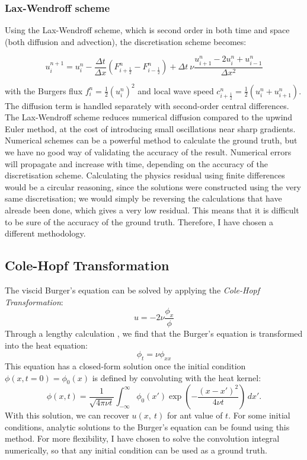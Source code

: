 \documentclass[we,twoside,openright,a4paper,11pt]{uantwerpenbamathesis}
\begin{document}
\subsubsection{Lax-Wendroff scheme}
Using the Lax-Wendroff scheme, which is second order in both time and space (both diffusion and advection), the discretisation scheme becomes:

\begin{equation}
    u_i^{n+1} = u_i^n - \frac{\Delta t}{\Delta x}\left(F_{i+\frac{1}{2}}^n - F_{i-\frac{1}{2}}^n\right) + \Delta t \ \nu \frac{u_{i+1}^n - 2u_i^n + u_{i-1}^n}{\Delta x^2}
\end{equation}

with the Burgers flux $f_i^n = \tfrac{1}{2}(u_i^n)^2$ and local wave speed $c_{i+\frac{1}{2}}^n = \tfrac{1}{2}(u_i^n + u_{i+1}^n)$. The diffusion term is handled separately with second-order central differences. The Lax-Wendroff scheme reduces numerical diffusion compared to the upwind Euler method, at the cost of introducing small oscillations near sharp gradients.\\

Numerical schemes can be a powerful method to calculate the ground truth, but we have no good way of validating the accuracy of the result.  Numerical errors will propagate and increase with time, depending on the accuracy of the discretisation scheme. Calculating the physics residual using finite differences would be a circular reasoning, since the solutions were constructed using the very same discretisation; we would simply be reversing the calculations that have alreade been done, which gives a very low residual. This means that it is difficult to be sure of the accuracy of the ground truth. Therefore, I have chosen a different methodology.

\subsection{Cole-Hopf Transformation}
The viscid Burger's equation can be solved by applying the \textit{Cole-Hopf Transformation}:
\begin{equation}
    u = -2\nu \frac{\phi_x}{\phi}
\end{equation}
Through a lengthy calculation \cite{whitham2011linear}, we find that the Burger's equation is transformed into the heat equation:
\begin{equation}
    \phi_t = \nu\phi_{xx}
\end{equation}
This equation has a closed-form solution once the initial condition $\phi(x,t=0)=\phi_0(x)$ is defined by convoluting with the heat kernel:
\begin{equation}
    \phi(x,t)
    =
    \frac{1}{\sqrt{4\pi \nu t}}
    \int_{-\infty}^{\infty}
    \phi_0(x')
    \exp\left(
        -\frac{(x-x')^2}{4\nu t}
    \right)\,dx'.
\end{equation}
With this solution, we can recover $u(x,\ t)$ for ant value of $t$. For some initial conditions, analytic solutions to the Burger's equation can be found using this method. For more flexibility, I have chosen to solve the convolution integral numerically, so that any initial condition can be used as a ground truth.\\
\end{document}
